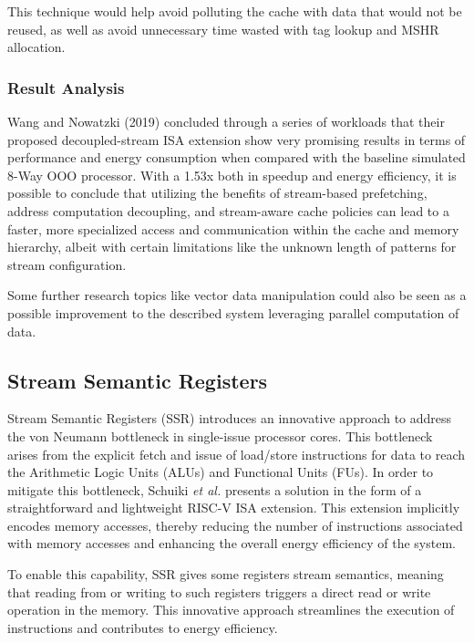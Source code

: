 This technique would help avoid polluting the cache with data that would not be reused, as well as avoid unnecessary time wasted with tag lookup and MSHR allocation.


\subsubsection{Result Analysis}

Wang and Nowatzki (2019) \cite{8980305} concluded through a series of workloads that their proposed decoupled-stream ISA extension show very promising results in terms of performance and energy consumption when compared with the baseline simulated 8-Way OOO processor. 
With a 1.53x both in speedup and energy efficiency, it is possible to conclude that utilizing the benefits of stream-based prefetching, address computation decoupling, and stream-aware cache policies can lead to a faster, more specialized access and communication within the cache and memory hierarchy, albeit with certain limitations like the unknown length of patterns for stream configuration.

Some further research topics like vector data manipulation could also be seen as a possible improvement to the described system leveraging parallel computation of data.

\subsection{Stream Semantic Registers}
\label{label:ssr}

Stream Semantic Registers (SSR) \cite{9068465} introduces an innovative approach to address the von Neumann bottleneck in single-issue processor cores. This bottleneck arises from the explicit fetch and issue of load/store instructions for data to reach the Arithmetic Logic Units (ALUs) and Functional Units (FUs). In order to mitigate this bottleneck, Schuiki \textit{et al.} \cite{9068465} presents a solution in the form of a straightforward and lightweight RISC-V ISA extension. This extension implicitly encodes memory accesses, thereby reducing the number of instructions associated with memory accesses and enhancing the overall energy efficiency of the system.

To enable this capability, SSR gives some registers stream semantics, meaning that reading from or writing to such registers triggers a direct read or write operation in the memory. This innovative approach streamlines the execution of instructions and contributes to energy efficiency.

